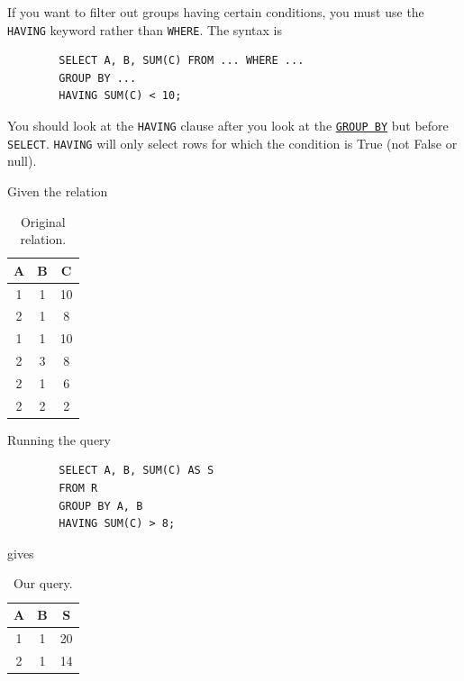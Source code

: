     \begin{definition}
      \label{def:having}
      If you want to filter out groups having certain conditions, you must use the \texttt{HAVING} keyword rather than \texttt{WHERE}. The syntax is 
      \begin{lstlisting}
        SELECT A, B, SUM(C) FROM ... WHERE ... 
        GROUP BY ... 
        HAVING SUM(C) < 10; 
      \end{lstlisting}
      You should look at the \texttt{HAVING} clause after you look at the \hyperref[def:group-by]{\texttt{GROUP BY}} but before \texttt{SELECT}. \texttt{HAVING} will only select rows for which the condition is True (not False or null). 
    \end{definition}

    \begin{example}
      \label{ex:having-on-a-sample-relation}
      Given the relation 

      \begin{table}[H]
        \centering
        \begin{tabular}{|c|c|c|}
          \hline
          \textbf{A} & \textbf{B} & \textbf{C} \\
          \hline
          1 & 1 & 10 \\ 
          2 & 1 & 8 \\ 
          1 & 1 & 10 \\ 
          2 & 3 & 8 \\ 
          2 & 1 & 6 \\ 
          2 & 2 & 2 \\ 
          \hline
        \end{tabular}
        \caption{Original relation. }
        \label{tab:groupby2}
      \end{table}
    
      Running the query 
      \begin{lstlisting}
        SELECT A, B, SUM(C) AS S 
        FROM R 
        GROUP BY A, B 
        HAVING SUM(C) > 8; 
      \end{lstlisting}
      gives 
      
      \begin{table}[H]
        \centering
        \begin{tabular}{|c|c|c|}
          \hline
          \textbf{A} & \textbf{B} & \textbf{S} \\
          \hline
          1 & 1 & 20 \\ 
          2 & 1 & 14 \\ 
          \hline
        \end{tabular}
        \caption{Our query. }
        \label{tab:groupby2_output}
      \end{table}
    \end{example}

